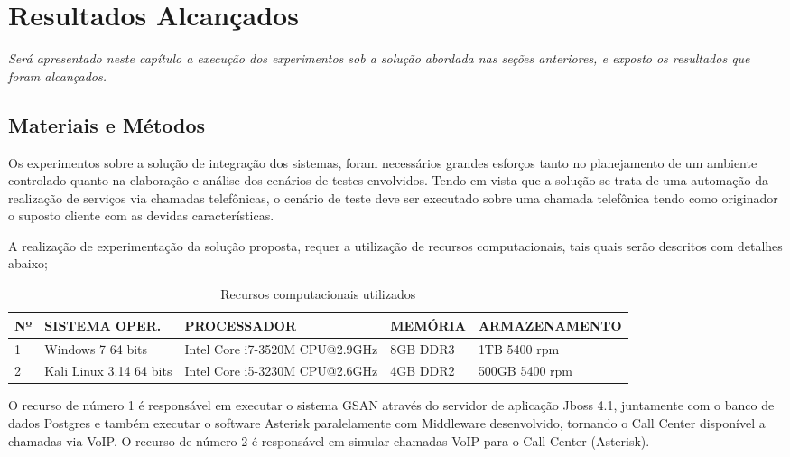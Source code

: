 \chapter[Resultados Alcançados]{\textbf{R}esultados \textbf{A}lcançados}

\textit{Será apresentado neste capítulo a execução dos experimentos sob a solução abordada nas seções anteriores, e exposto os resultados que foram alcançados.}

\section{Materiais e Métodos}

Os experimentos sobre a solução de integração dos sistemas, foram necessários grandes esforços tanto no planejamento de um ambiente controlado quanto na elaboração e análise dos cenários de testes envolvidos. 
Tendo em vista que a solução se trata de uma automação da realização de serviços via chamadas telefônicas, o cenário de teste deve ser executado sobre uma chamada telefônica tendo como originador o suposto cliente com as devidas características. 

A realização de experimentação da solução proposta, requer a utilização de recursos computacionais, tais quais serão descritos com detalhes abaixo;

\begin{table}[htb]
	\footnotesize
	\caption{Recursos computacionais utilizados}
	\label{tabela:recursosUtilizados}
	\begin{tabular}{|p{0.5cm}|p{3.5cm}|p{3cm}|p{2cm}|p{4cm}|} \hline
		\textbf{Nº} & \textbf{SISTEMA OPER.} 	& \textbf{PROCESSADOR} 				& \textbf{MEMÓRIA} 	& \textbf{ARMAZENAMENTO}  \\ \hline
		1 			& Windows 7 64 bits 		& Intel Core i7-3520M CPU@2.9GHz 	& 8GB DDR3			& 1TB 5400 rpm \\ \hline
		2 			& Kali Linux 3.14 64 bits 	& Intel Core i5-3230M CPU@2.6GHz	& 4GB DDR2			& 500GB 5400 rpm \\ \hline
	\end{tabular}
\end{table}

O recurso de número 1 é responsável em executar o sistema GSAN através do servidor de aplicação Jboss 4.1, juntamente com o banco de dados Postgres e também executar o software Asterisk paralelamente com Middleware desenvolvido, tornando o Call Center disponível a chamadas via VoIP.
O recurso de número 2 é responsável em simular chamadas VoIP para o Call Center (Asterisk).	


